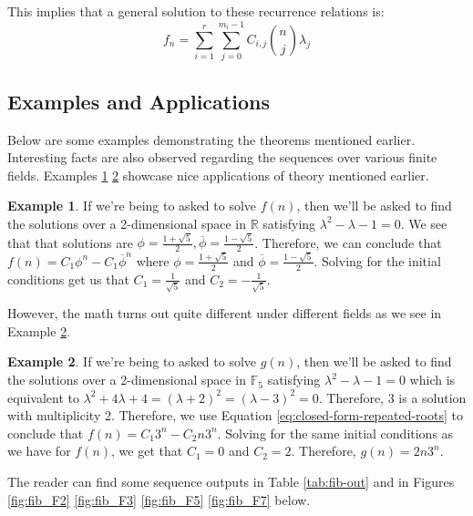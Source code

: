 \documentclass[a4paper]{article}
\theoremstyle{definition}
\newtheorem{example}{Example}[section]
\begin{document}
This implies that a general solution to these recurrence relations is:
\begin{equation}
f_n=\sum_{i=1}^r\sum_{j=0}^{m_i-1} C_{i,j}\binom{n}{j}\lambda_j
\label{eq:closed-form-repeated-roots}
\end{equation}

\subsection{Examples and Applications}

Below are some examples demonstrating the theorems mentioned earlier. Interesting facts are also observed regarding the sequences over various finite fields. Examples \ref{ex:fib-sol-R} \ref{ex:fib-sol-F_5} showcase nice applications of theory mentioned earlier.
\\
\begin{example}
If we're being to asked to solve $f(n)$, then we'll be asked to find the solutions over a 2-dimensional space in $\mathbb{R}$ satisfying $\lambda^2-\lambda-1=0$. We see that that solutions are $\phi=\frac{1+\sqrt{5}}{2}, \overline{\phi}=\frac{1-\sqrt{5}}{2}$. Therefore, we can conclude that $f(n)= C_1\phi^n-C_1\overline{\phi}^n$ where $\phi=\frac{1+\sqrt{5}}{2}$ and $\overline{\phi}=\frac{1-\sqrt{5}}{2}$. Solving for the initial conditions get us that $C_1=\frac{1}{\sqrt{5}}$ and $C_2=-\frac{1}{\sqrt{5}}$.
\label{ex:fib-sol-R}
\end{example}

However, the math turns out quite different under different fields as we see in Example \ref{ex:fib-sol-F_5}.
\\
\begin{example}
If we're being to asked to solve $g(n)$, then we'll be asked to find the solutions over a 2-dimensional space in $\mathbb{F}_5$ satisfying $\lambda^2-\lambda-1=0$ which is equivalent to $\lambda^2+4\lambda+4=(\lambda+2)^2=(\lambda-3)^2=0$. Therefore, $3$ is a solution with multiplicity 2. Therefore, we use Equation \ref{eq:closed-form-repeated-roots} to conclude that $f(n)= C_1 3^n-C_2n 3^n$. Solving for the same initial conditions as we have for $f(n)$, we get that $C_1=0$ and $C_2=2$. Therefore, $g(n)=2n3^n$.
\label{ex:fib-sol-F_5}
\end{example}

The reader can find some sequence outputs in Table \ref{tab:fib-out} and in Figures \ref{fig:fib_F2} \ref{fig:fib_F3} \ref{fig:fib_F5} \ref{fig:fib_F7} below.
\end{document}
